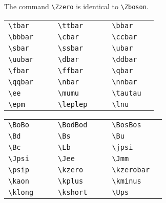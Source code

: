 \documentclass{../atlasnote}
\begin{document}
\medskip

\noindent The command \verb+\Zzero+ is identical to \verb+\Zboson+.

\medskip

\begin{tabular}{llcllcll}
  \verb+\tbar+ & \tbar{} & \hspace{1cm} &
  \verb+\ttbar+ & \ttbar{} & \hspace{1cm} &
  \verb+\bbar+ & \bbar{} \\
  \verb+\bbbar+ & \bbbar{} & &
  \verb+\cbar+ & \cbar{} & &
  \verb+\ccbar+ & \ccbar{} \\
  \verb+\sbar+ & \sbar{} & &
  \verb+\ssbar+ &  \ssbar{} & &
  \verb+\ubar+ & \ubar{} \\
  \verb+\uubar+ & \uubar{} & &
  \verb+\dbar+ & \dbar{} & &
  \verb+\ddbar+ & \ddbar{} \\
  \verb+\fbar+ & \fbar{} & &
  \verb+\ffbar+ &  \ffbar{} & &
  \verb+\qbar+ & \qbar{} \\
  \verb+\qqbar+ & \qqbar{} & &
  \verb+\nbar+ & \nbar{} & &
  \verb+\nnbar+ & \nnbar{} \\
  \verb+\ee+ & \ee{} & &
  \verb+\mumu+ & \mumu{} & &
  \verb+\tautau+ & \tautau{} \\
  \verb+\epm+ & \epm{} & &
  \verb+\leplep+ & \leplep{} & & 
  \verb+\lnu+ & \lnu{} \\
\end{tabular}

\medskip

\begin{tabular}{llcllcll}
  \verb+\BoBo+ & \BoBo{} & \hspace{1cm} &
  \verb+\BodBod+ & \BodBod{} & \hspace{1cm} &
  \verb+\BosBos+ & \BosBos{} \\
  \verb+\Bd+ & \Bd{} & &
  \verb+\Bs+ & \Bs{} & &
  \verb+\Bu+ & \Bu{} \\
  \verb+\Bc+ & \Bc{} & &
  \verb+\Lb+ & \Lb{} & &
  \verb+\jpsi+ & \jpsi{} \\
  \verb+\Jpsi+ & \Jpsi{} & &
  \verb+\Jee+ & \Jee{} & &
  \verb+\Jmm+ & \Jmm{} \\
  \verb+\psip+ & \psip{} & &
  \verb+\kzero+ & \kzero{} & &
  \verb+\kzerobar+ & \kzerobar{} \\
  \verb+\kaon+ & \kaon{} & &
  \verb+\kplus+ & \kplus{} & &
  \verb+\kminus+ & \kminus{} \\
  \verb+\klong+ & \klong{} & &
  \verb+\kshort+ & \kshort{} & &
  \verb+\Ups+ & \Ups{} \\
\end{tabular}
\end{document}
